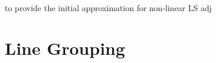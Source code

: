 to provide the initial approximation for non-linear LS adj





\section{Line Grouping}
\label{sec:}









